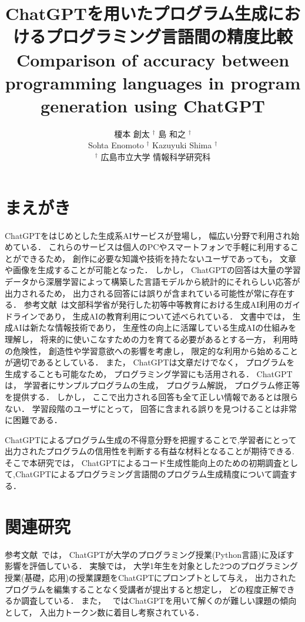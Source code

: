 \documentclass[a4j,twocolumn,9pt]{jarticle}
\title{ ChatGPTを用いたプログラム生成におけるプログラミング言語間の精度比較\\
Comparison of accuracy between programming languages in program generation using ChatGPT
}
\author{%
榎本 創太 $^{\dagger}$ 島 和之 $^{\dagger}$ \\
Sohta Enomoto $^{\dagger}$ Kazuyuki Shima $^{\dagger}$\\
$^{\dagger}$ 広島市立大学 情報科学研究科 \hspace*{1em}
}
\begin{document}
\maketitle
\thispagestyle{empty} %
\pagestyle{empty} %
\baselineskip=4.5mm %

\section{まえがき}
ChatGPTをはじめとした生成系AIサービスが登場し， 幅広い分野で利用され始めている．
これらのサービスは個人のPCやスマートフォンで手軽に利用することができるため， 創作に必要な知識や技術を持たないユーザであっても， 文章や画像を生成することが可能となった．
しかし， ChatGPTの回答は大量の学習データから深層学習によって構築した言語モデルから統計的にそれらしい応答が出力されるため， 出力される回答には誤りが含まれている可能性が常に存在する． 
参考文献~\cite{Monkasyo2023}は文部科学省が発行した初等中等教育における生成AI利用のガイドラインであり， 生成AIの教育利用について述べられている． 
文書中では， 生成AIは新たな情報技術であり， 生産性の向上に活躍している生成AIの仕組みを理解し， 将来的に使いこなすための力を育てる必要があるとする一方， 利用時の危険性， 創造性や学習意欲への影響を考慮し， 限定的な利用から始めることが適切であるとしている． 
また， ChatGPTは文章だけでなく， プログラムを生成することも可能なため， プログラミング学習にも活用される．
ChatGPTは， 学習者にサンプルプログラムの生成， プログラム解説， プログラム修正等を提供する． 
しかし， ここで出力される回答も全て正しい情報であるとは限らない． 
学習段階のユーザにとって， 回答に含まれる誤りを見つけることは非常に困難である． 

ChatGPTによるプログラム生成の不得意分野を把握することで,学習者にとって出力されたプログラムの信用性を判断する有益な材料となることが期待できる.
そこで本研究では， ChatGPTによるコード生成性能向上のための初期調査として,ChatGPTによるプログラミング言語間のプログラム生成精度について調査する． 

\section{関連研究}
参考文献~\cite{Suzuki2023}では， ChatGPTが大学のプログラミング授業(Python言語)に及ぼす影響を評価している． 
実験では， 大学1年生を対象とした2つのプログラミング授業(基礎，応用)の授業課題をChatGPTにプロンプトとして与え， 出力されたプログラムを編集することなく受講者が提出すると想定し， どの程度正解できるか調査している． 
また， ~\cite{Suzuki2023}ではChatGPTを用いて解くのが難しい課題の傾向として， 入出力トークン数に着目し考察されている． 
\end{document}
